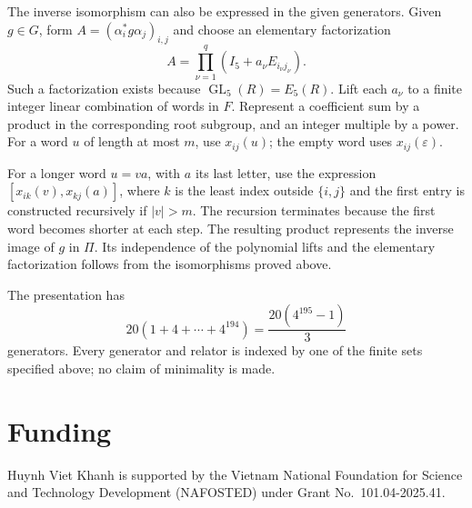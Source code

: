 \documentclass[11pt]{amsart}
\DeclareMathOperator{\GL}{GL}
\theoremstyle{definition}
\theoremstyle{remark}
\numberwithin{equation}{section}
\begin{document}
The inverse isomorphism can also be expressed in the given generators. Given $g\in G$, form $A=(\alpha_i^*g\alpha_j)_{i,j}$ and choose an elementary factorization
$$
A=\prod_{\nu=1}^q(I_5+a_\nu E_{i_\nu j_\nu}).
$$
Such a factorization exists because $\GL_5(R)=E_5(R)$. Lift each $a_\nu$ to a finite integer linear combination of words in $F$. Represent a coefficient sum by a product in the corresponding root subgroup, and an integer multiple by a power. For a word $u$ of length at most $m$, use $x_{ij}(u)$; the empty word uses $x_{ij}(\varepsilon)$.

For a longer word $u=va$, with $a$ its last letter, use the expression $[x_{ik}(v),x_{kj}(a)]$, where $k$ is the least index outside $\{i,j\}$ and the first entry is constructed recursively if $|v|>m$. The recursion terminates because the first word becomes shorter at each step. The resulting product represents the inverse image of $g$ in $\Pi$. Its independence of the polynomial lifts and the elementary factorization follows from the isomorphisms proved above.

The presentation has
$$
20(1+4+\cdots+4^{194})=\frac{20(4^{195}-1)}3
$$
generators. Every generator and relator is indexed by one of the finite sets specified above; no claim of minimality is made.

\section*{Funding}

Huynh Viet Khanh is supported by the Vietnam National Foundation for Science and Technology Development (NAFOSTED) under Grant No.~101.04-2025.41.
\end{document}
